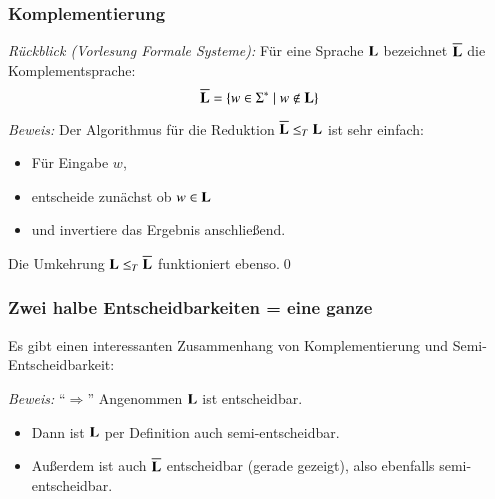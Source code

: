 \documentclass[aspectratio=1610,onlymath]{beamer}
\begin{document}
\begin{frame}\frametitle{Komplementierung}

\emph{Rückblick (Vorlesung Formale Systeme):} Für eine Sprache $\textbf{\textcolor{black}{L}}$ bezeichnet $\overline{\textbf{\textcolor{black}{L}}}$ die \alert{Komplementsprache}:
\[ \overline{\textbf{\textcolor{black}{L}}} = \{w\in\Sigma^*\mid w\notin\textbf{\textcolor{black}{L}} \}\]\pause


\pause
\emph{Beweis:} Der Algorithmus für die Reduktion $\overline{\textbf{\textcolor{black}{L}}}\leq_T\textbf{\textcolor{black}{L}}$ ist sehr einfach:
\begin{itemize}
\item Für Eingabe $w$,
\item entscheide zunächst ob $w\in\textbf{\textcolor{black}{L}}$
\item und invertiere das Ergebnis anschließend.
\end{itemize}
Die Umkehrung $\textbf{\textcolor{black}{L}}\leq_T\overline{\textbf{\textcolor{black}{L}}}$ funktioniert ebenso.\qed
\bigskip\pause


\end{frame}

\begin{frame}[t]\frametitle{Zwei halbe Entscheidbarkeiten = eine ganze}

Es gibt einen interessanten Zusammenhang von Komplementierung und Semi-Entscheidbarkeit:\\[1ex]

\pause

\emph{Beweis:} "`$\Rightarrow$"' Angenommen $\textbf{\textcolor{black}{L}}$ ist entscheidbar.\pause

\begin{itemize}
\item Dann ist $\textbf{\textcolor{black}{L}}$ per Definition auch semi-entscheidbar.
\item Außerdem ist auch $\overline{\textbf{\textcolor{black}{L}}}$ entscheidbar (gerade gezeigt), also ebenfalls semi-entscheidbar.
\end{itemize}

\end{frame}
\end{document}
